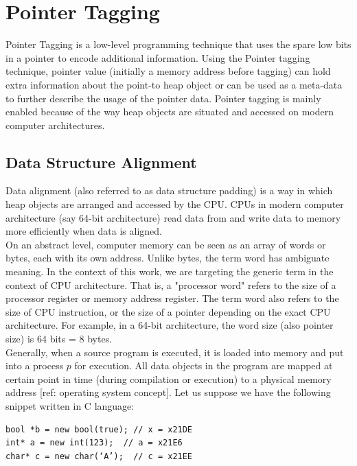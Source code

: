 \section{Pointer Tagging}
\label{sec:preliminaries:pointertagging}

Pointer Tagging is a low-level programming technique that uses the spare low bits in a pointer to encode additional information. Using the Pointer tagging technique, pointer value (initially a memory address before tagging) can hold extra information about the point-to heap object or can be used as a meta-data to further describe the usage of the pointer data. Pointer tagging is mainly enabled because of the way heap objects are situated and accessed on modern computer architectures.



\subsection{Data Structure Alignment}
\label{sec:preliminaries:data_alignment}
Data alignment (also referred to as data structure padding) is a way in which heap objects are arranged and accessed by the CPU. CPUs in modern computer architecture (say 64-bit architecture) read data from and write data to memory more efficiently when data is aligned.  \\

On an abstract level, computer memory can be seen as an array of words or bytes, each with its own address. Unlike bytes, the term word has ambiguate meaning. In the context of this work, we are targeting the generic term in the context of CPU architecture. That is, a "processor word" refers to the size of a processor register or memory address register. The term word also refers to the size of CPU instruction, or the size of a pointer depending on the exact CPU architecture. For example, in a 64-bit architecture, the word size (also pointer size) is 64 bits = 8 bytes. \\

Generally, when a source program is executed, it is loaded into memory and put into a process $p$ for execution. All data objects in the program are mapped at certain point in time (during compilation or execution) to a physical memory address [ref: operating system concept]. Let us suppose we have the following snippet written in C language: \\

\begin{verbatim}
bool *b = new bool(true); // x = x21DE
int* a = new int(123);  // a = x21E6
char* c = new char(‘A’);  // c = x21EE
\end{verbatim}


